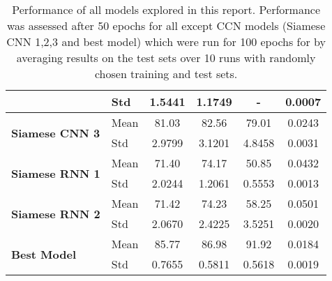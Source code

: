 \begin{table}[]
\begin{tabular}{|llcccc|}
                                                 & Std & 1.5441                       & 1.1749                 & -                                   & 0.0007                    \\ \hline
\multirow{2}{*}{\textbf{Siamese CNN 3}}          & Mean            & 81.03                        & 82.56                  & 79.01                               & 0.0243                    \\
                                                 & Std & 2.9799                       & 3.1201                 & 4.8458                              & 0.0031                    \\ \hline
\multirow{2}{*}{\textbf{Siamese RNN 1}}          & Mean            & 71.40                        & 74.17                  & 50.85                               & 0.0432                    \\
                                                 & Std & 2.0244                       & 1.2061                 & 0.5553                              & 0.0013                    \\ \hline
\multirow{2}{*}{\textbf{Siamese RNN 2}}          & Mean            & 71.42                        & 74.23                  & 58.25                               & 0.0501                    \\
                                                 & Std & 2.0670                       & 2.4225                 & 3.5251                              & 0.0020                    \\ \hline
\multirow{2}{*}{\textbf{Best Model}}             & Mean            & 85.77                        & 86.98                  & 91.92                               & 0.0184                    \\
                                                 & Std & 0.7655                       & 0.5811                 & 0.5618                              & 0.0019                    \\ \hline
\end{tabular}
\caption{Performance of all models explored in this report. Performance was assessed after 50 epochs for all except CCN models (Siamese CNN 1,2,3 and best model) which were run for 100 epochs for by averaging results on the test sets over 10 runs with randomly chosen training and test sets.}
\label{tab:final-table}
\end{table}